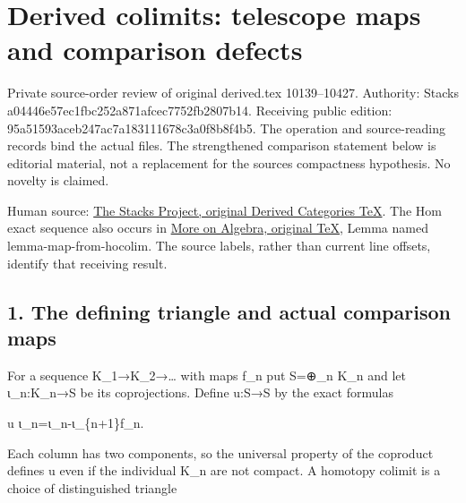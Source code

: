 \section{\texorpdfstring{Derived colimits:\allowbreak{} telescope maps and comparison defects}{Derived  telescope maps and comparison defects}}\label{proofs-10139-10427-derived-colimits-telescope-maps-and-comparison-defects}

Private source-order review of original derived.tex 10139–\allowbreak{}10427. Authority:\allowbreak{} Stacks a04446e5\allowbreak{}7ec1fbc2\allowbreak{}52a871af\allowbreak{}cec7752f\allowbreak{}b2807b14. Receiving public edition:\allowbreak{} 95a51593\allowbreak{}aceb247a\allowbreak{}c7a18311\allowbreak{}1678c3a0\allowbreak{}f8b8f4b5. The operation and source-reading records bind the actual files. The strengthened comparison statement below is editorial material,\allowbreak{} not a replacement for the source\textquotesingle s compactness hypothesis. No novelty is claimed.

Human source:\allowbreak{} \href{https://github.com/stacks/stacks-project/blob/a04446e57ec1fbc252a871afcec7752fb2807b14/derived.tex\#L10139}{The Stacks Project,\allowbreak{} original Derived Categories TeX}. The Hom exact sequence also occurs in \href{https://github.com/stacks/stacks-project/blob/a04446e57ec1fbc252a871afcec7752fb2807b14/more-algebra.tex}{More on Algebra,\allowbreak{} original TeX},\allowbreak{} Lemma named lemma-map-from-hocolim. The source labels,\allowbreak{} rather than current line offsets,\allowbreak{} identify that receiving result.

\subsection{1. The defining triangle and actual comparison maps}\label{proofs-10139-10427-the-defining-triangle-and-actual-comparison-maps}

For a sequence K\_\allowbreak{}1\allowbreak{}→K\_\allowbreak{}2\allowbreak{}→… with maps f\_\allowbreak{}n put S\allowbreak{}=\allowbreak{}⊕\_\allowbreak{}n K\_\allowbreak{}n and let ι\_\allowbreak{}n:\allowbreak{}K\_\allowbreak{}n\allowbreak{}→S be its coprojections. Define u:\allowbreak{}S\allowbreak{}→S by the exact formulas

u ι\_\allowbreak{}n\allowbreak{}=ι\_\allowbreak{}n-ι\_\allowbreak{}\{n\allowbreak{}+1\}f\_\allowbreak{}n.

Each column has two components,\allowbreak{} so the universal property of the coproduct defines u even if the individual K\_\allowbreak{}n are not compact. A homotopy colimit is a choice of distinguished triangle

